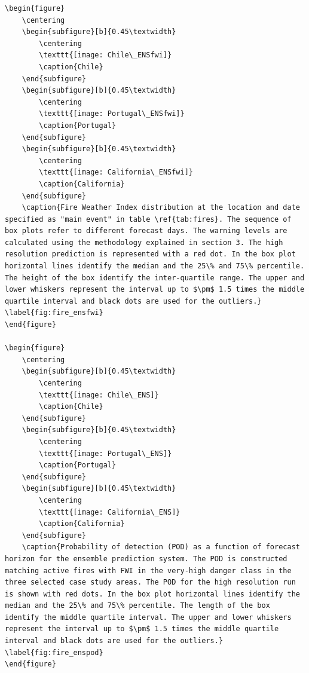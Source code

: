 \documentclass[, manuscript]{copernicus}
\begin{document}
\begin{verbatim}
\begin{figure}
    \centering
    \begin{subfigure}[b]{0.45\textwidth}
        \centering
        \texttt{[image: Chile\_ENSfwi]}
        \caption{Chile}
    \end{subfigure}
    \begin{subfigure}[b]{0.45\textwidth}
        \centering
        \texttt{[image: Portugal\_ENSfwi]}
        \caption{Portugal}
    \end{subfigure}
    \begin{subfigure}[b]{0.45\textwidth}
        \centering
        \texttt{[image: California\_ENSfwi]}
        \caption{California}
    \end{subfigure}
    \caption{Fire Weather Index distribution at the location and date specified as "main event" in table \ref{tab:fires}. The sequence of box plots refer to different forecast days. The warning levels are calculated using the methodology explained in section 3. The high resolution prediction is represented with a red dot. In the box plot horizontal lines identify the median and the 25\% and 75\% percentile. The height of the box identify the inter-quartile range. The upper and lower whiskers represent the interval up to $\pm$ 1.5 times the middle quartile interval and black dots are used for the outliers.} \label{fig:fire_ensfwi}
\end{figure}

\begin{figure}
    \centering
    \begin{subfigure}[b]{0.45\textwidth}
        \centering
        \texttt{[image: Chile\_ENS]}
        \caption{Chile}
    \end{subfigure}
    \begin{subfigure}[b]{0.45\textwidth}
        \centering
        \texttt{[image: Portugal\_ENS]}
        \caption{Portugal}
    \end{subfigure}
    \begin{subfigure}[b]{0.45\textwidth}
        \centering
        \texttt{[image: California\_ENS]}
        \caption{California}
    \end{subfigure}
    \caption{Probability of detection (POD) as a function of forecast horizon for the ensemble prediction system. The POD is constructed matching active fires with FWI in the very-high danger class in the three selected case study areas. The POD for the high resolution run is shown with red dots. In the box plot horizontal lines identify the median and the 25\% and 75\% percentile. The length of the box identify the middle quartile interval. The upper and lower whiskers represent the interval up to $\pm$ 1.5 times the middle quartile interval and black dots are used for the outliers.} \label{fig:fire_enspod}
\end{figure}
\end{verbatim}
\end{document}
